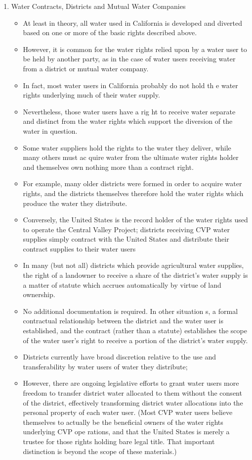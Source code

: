 \documentclass{article}
\begin{document}
\begin{enumerate}
\begin{itemize}
\begin{enumerate}
\item Water Contracts, Districts and Mutual Water Companies 
\begin{itemize}
\item At least in theory, all water used in California is developed and diverted based on one or more of the basic rights described above. \item However, it is common for the water rights relied upon by a water user to be held by another party, as in the case of water users receiving water from a district or mutual water company. 
\item In fact, most water users in California probably do not hold th e water rights underlying much of their water supply. 
\item Nevertheless, those water users have a rig ht to receive water separate and distinct from the water rights which support the diversion of the water in question. 
\item Some water suppliers hold the rights to the water they deliver, while many others must ac quire water from the ultimate water rights holder and themselves own nothing more than a contract right. 
\item For example, many older districts were formed in order to acquire water rights, and the districts themselves therefore hold the water rights which produce the water they distribute. 
\item Conversely, the United States is the record holder of the water rights used to operate the Central Valley Project; districts receiving CVP water supplies simply contract with the United States and distribute their contract supplies to their water users
\item In many (but not all) districts which provide agricultural water supplies, the right of a landowner to receive a share of the district's water supply is a matter of statute which accrues automatically by virtue of land ownership.
\item No additional documentation is required. In other situation s, a formal contractual relationship between the district and the water user is established, and the contract (rather than a statute) establishes the scope of the water user's right to receive a portion of the district's water supply. 
\item Districts currently have broad discretion relative to the use and transferability by water users of water they distribute; 
\item However, there are ongoing legislative efforts to grant water users more freedom to transfer district water allocated to them without the consent of the district, effectively transforming district water allocations into the personal property of each water user. (Most CVP water users believe themselves to actually be the beneficial owners of the water rights underlying CVP ope rations, and that the United States is merely a trustee for those rights holding bare legal title. That important distinction is beyond the scope of these materials.)

\end{itemize}
\end{enumerate}
\end{itemize}
\end{enumerate}
\end{document}
